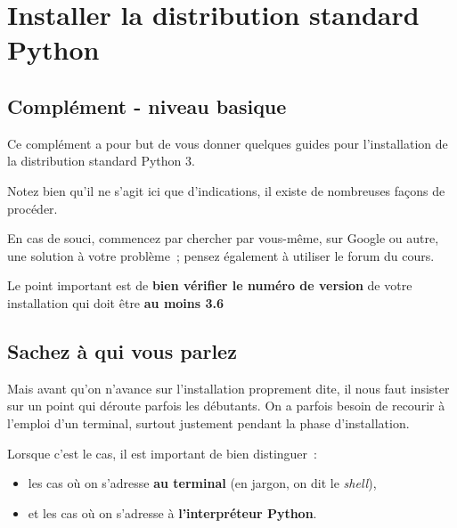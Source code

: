     
    
    
    

    

    \hypertarget{installer-la-distribution-standard-python}{%
\section{Installer la distribution standard
Python}\label{installer-la-distribution-standard-python}}

    \hypertarget{compluxe9ment---niveau-basique}{%
\subsection{Complément - niveau
basique}\label{compluxe9ment---niveau-basique}}

    Ce complément a pour but de vous donner quelques guides pour
l'installation de la distribution standard Python 3.

Notez bien qu'il ne s'agit ici que d'indications, il existe de
nombreuses façons de procéder.

En cas de souci, commencez par chercher par vous-même, sur Google ou
autre, une solution à votre problème~; pensez également à utiliser le
forum du cours.

    Le point important est de \textbf{bien vérifier le numéro de version} de
votre installation qui doit être \textbf{au moins 3.6}

    \hypertarget{sachez-uxe0-qui-vous-parlez}{%
\subsection{Sachez à qui vous
parlez}\label{sachez-uxe0-qui-vous-parlez}}

    Mais avant qu'on n'avance sur l'installation proprement dite, il nous
faut insister sur un point qui déroute parfois les débutants. On a
parfois besoin de recourir à l'emploi d'un terminal, surtout justement
pendant la phase d'installation.

Lorsque c'est le cas, il est important de bien distinguer~:

\begin{itemize}
\tightlist
\item
  les cas où on s'adresse \textbf{au terminal} (en jargon, on dit le
  \emph{shell}),
\item
  et les cas où on s'adresse à \textbf{l'interpréteur Python}.
\end{itemize}

